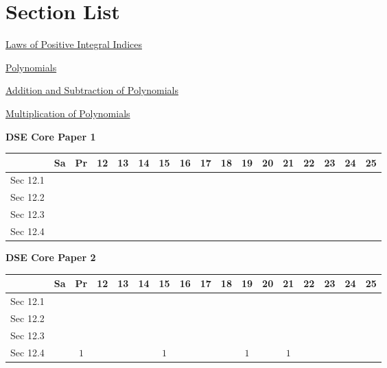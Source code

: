 \documentclass[12pt, a4paper]{article}
\begin{document}
\section*{Section List}
\begin{enumx}[label=Sec 12.\arabic*\ ]
\item \hyperref[section:1-12-1]{Laws of Positive Integral Indices}
\item \hyperref[section:1-12-2]{Polynomials}
\item \hyperref[section:1-12-3]{Addition and Subtraction of Polynomials}
\item \hyperref[section:1-12-4]{Multiplication of Polynomials}
\end{enumx}
\begin{absolutelynopagebreak}
\begin{center}
\textbf{DSE Core Paper 1}
\end{center}
\begin{center}
\begin{tabular}{|l|c|c|c|c|c|c|c|c|c|c|c|c|c|c|c|c|}
\hline
        & Sa & Pr & 12 & 13 & 14 & 15 & 16 & 17 & 18 & 19 & 20 & 21 & 22 & 23 & 24 & 25 \\\hline\hline
Sec 12.1 &  &  &  &  &  &  &  &  &  &  &  &  &  &  &  &  \\\hline
Sec 12.2 &  &  &  &  &  &  &  &  &  &  &  &  &  &  &  &  \\\hline
Sec 12.3 &  &  &  &  &  &  &  &  &  &  &  &  &  &  &  &  \\\hline
Sec 12.4 &  &  &  &  &  &  &  &  &  &  &  &  &  &  &  &  \\\hline
\end{tabular}
\end{center}
\end{absolutelynopagebreak}
\begin{absolutelynopagebreak}
\begin{center}
\textbf{DSE Core Paper 2}
\end{center}
\begin{center}
\begin{tabular}{|l|c|c|c|c|c|c|c|c|c|c|c|c|c|c|c|c|}
\hline
        & Sa & Pr & 12 & 13 & 14 & 15 & 16 & 17 & 18 & 19 & 20 & 21 & 22 & 23 & 24 & 25 \\\hline\hline
Sec 12.1 &  &  &  &  &  &  &  &  &  &  &  &  &  &  &  &  \\\hline
Sec 12.2 &  &  &  &  &  &  &  &  &  &  &  &  &  &  &  &  \\\hline
Sec 12.3 &  &  &  &  &  &  &  &  &  &  &  &  &  &  &  &  \\\hline
Sec 12.4 &  &  $1$ &  &  &  &  $1$ &  &  &  &  $1$ &  &  $1$ &  &  &  &  \\\hline
\end{tabular}
\end{center}
\end{absolutelynopagebreak}
\end{document}
